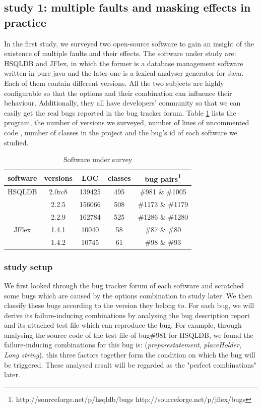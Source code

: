 \documentclass{sig-alternate}
\begin{document}
\subsection{study 1: multiple faults and masking effects in practice}
In the first study, we surveyed two open-source software to gain an insight of the existence of multiple faults and their effects. The software under study are: HSQLDB and JFlex, in which the former is a database management software written in pure java and the later one is a lexical analyser generator for Java. Each of them contain different versions. All the two subjects are highly configurable so that the options and their combination can influence their behaviour. Additionally, they all have developers' community so that we can easily get the real bugs reported in the bug tracker forum. Table \ref{software description} lists the program, the number of versions we surveyed, number of lines of uncommented code , number of classes in the project and the bug's id of each software we studied.

\begin{table}\renewcommand{\arraystretch}{1.3}
\caption{Software under survey}
\label{software description}
\begin{tabular}{c|c|c|c|c} \hline
software & versions & LOC & classes & bug pairs\footnote{ http://sourceforge.net/p/hsqldb/bugs
http://sourceforge.net/p/jflex/bugs  } \\ \hline

HSQLDB  &2.0rc8 & 139425 & 495 &  \#981 \& \#1005\\
	   &2.2.5 & 156066 & 508 & \#1173 \&  \#1179\\
	    &2.2.9 & 162784 &525 & \#1286 \& \#1280\\
JFlex  &1.4.1 &  10040 &58 & \#87 \& \#80 \\
      &1.4.2 &  10745 &61 &  \#98 \& \#93  \\
\hline\end{tabular}
\end{table}



\subsubsection{study setup}
We first looked through the bug tracker forum of each software and scratched some bugs which are caused by the options combination to study later. We then classify these bugs according to the version they belong to. For each bug, we will derive its failure-inducing combinations by analysing the bug description report and its attached test file which can reproduce the bug. For example, through analysing the source code of the test file of bug\#981 for HSQLDB, we found the failure-inducing combinations for this bug is: (\emph{preparestatement}, \emph{placeHolder}, \emph{Long string}), this three factors together form the condition on which the bug will be triggered. These analysed result will be regarded as the "perfect combinations" later.
\end{document}
